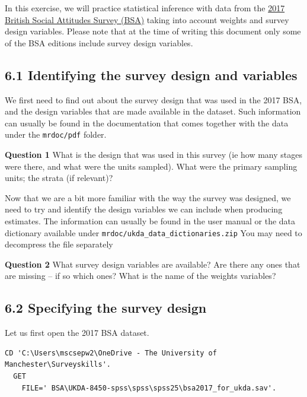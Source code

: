 \documentclass[
  14,
  a4paper,
  DIV=11,
  numbers=noendperiod]{scrartcl}
\begin{document}
In this exercise, we will practice statistical inference with data from
the
\href{https://beta.ukdataservice.ac.uk/datacatalogue/studies/study?id=8450}{2017
British Social Attitudes Survey (BSA)} taking into account weights and
survey design variables. Please note that at the time of writing this
document only some of the BSA editions include survey design variables.

\hypertarget{identifying-the-survey-design-and-variables-1}{%
\subsection{6.1 Identifying the survey design and
variables}\label{identifying-the-survey-design-and-variables-1}}

We first need to find out about the survey design that was used in the
2017 BSA, and the design variables that are made available in the
dataset. Such information can usually be found in the documentation that
comes together with the data under the \texttt{mrdoc/pdf} folder.

\textbf{Question 1} What is the design that was used in this survey (ie
how many stages were there, and what were the units sampled). What were
the primary sampling units; the strata (if relevant)?

Now that we are a bit more familiar with the way the survey was
designed, we need to try and identify the design variables we can
include when producing estimates. The information can usually be found
in the user manual or the data dictionary available under
\texttt{mrdoc/ukda\_data\_dictionaries.zip} You may need to decompress
the file separately

\textbf{Question 2} What survey design variables are available? Are
there any ones that are missing -- if so which ones? What is the name of
the weights variables?

\hypertarget{specifying-the-survey-design-1}{%
\subsection{6.2 Specifying the survey
design}\label{specifying-the-survey-design-1}}

Let us first open the 2017 BSA dataset.

\begin{verbatim}
CD 'C:\Users\mscsepw2\OneDrive - The University of Manchester\Surveyskills'.
  GET 
    FILE=' BSA\UKDA-8450-spss\spss\spss25\bsa2017_for_ukda.sav'.
\end{verbatim}
\end{document}

